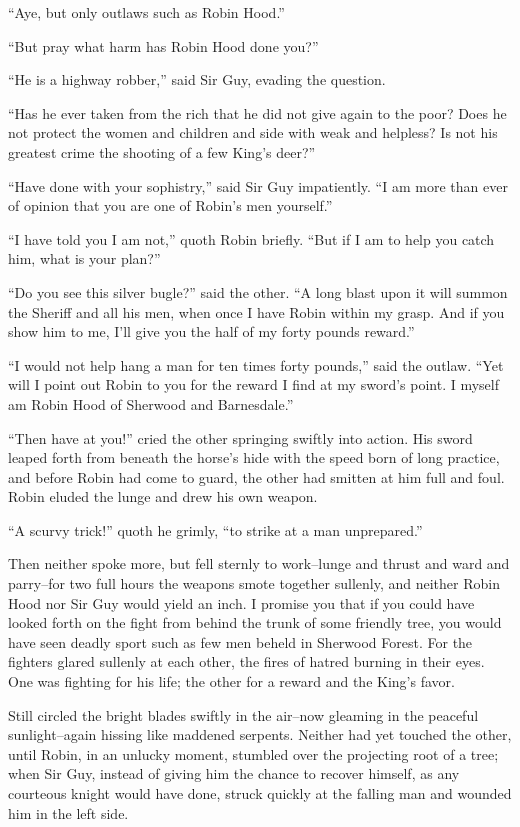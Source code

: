 ``Aye, but only outlaws such as Robin Hood.''

``But pray what harm has Robin Hood done you?''

``He is a highway robber,'' said Sir Guy, evading the question.

``Has he ever taken from the rich that he did not give again to the
poor? Does he not protect the women and children and side with weak and
helpless? Is not his greatest crime the shooting of a few King's deer?''

``Have done with your sophistry,'' said Sir Guy impatiently. ``I am more
than ever of opinion that you are one of Robin's men yourself.''

``I have told you I am not,'' quoth Robin briefly. ``But if I am to help
you catch him, what is your plan?''

``Do you see this silver bugle?'' said the other. ``A long blast upon it
will summon the Sheriff and all his men, when once I have Robin within
my grasp. And if you show him to me, I'll give you the half of my forty
pounds reward.''

``I would not help hang a man for ten times forty pounds,'' said the
outlaw. ``Yet will I point out Robin to you for the reward I find at my
sword's point. I myself am Robin Hood of Sherwood and Barnesdale.''

``Then have at you!'' cried the other springing swiftly into action. His
sword leaped forth from beneath the horse's hide with the speed born of
long practice, and before Robin had come to guard, the other had smitten
at him full and foul. Robin eluded the lunge and drew his own weapon.

``A scurvy trick!'' quoth he grimly, ``to strike at a man unprepared.''

Then neither spoke more, but fell sternly to work--lunge and thrust and
ward and parry--for two full hours the weapons smote together sullenly,
and neither Robin Hood nor Sir Guy would yield an inch. I promise you
that if you could have looked forth on the fight from behind the trunk
of some friendly tree, you would have seen deadly sport such as few men
beheld in Sherwood Forest. For the fighters glared sullenly at each
other, the fires of hatred burning in their eyes. One was fighting for
his life; the other for a reward and the King's favor.

Still circled the bright blades swiftly in the air--now gleaming in the
peaceful sunlight--again hissing like maddened serpents. Neither had yet
touched the other, until Robin, in an unlucky moment, stumbled over the
projecting root of a tree; when Sir Guy, instead of giving him the
chance to recover himself, as any courteous knight would have done,
struck quickly at the falling man and wounded him in the left side.

